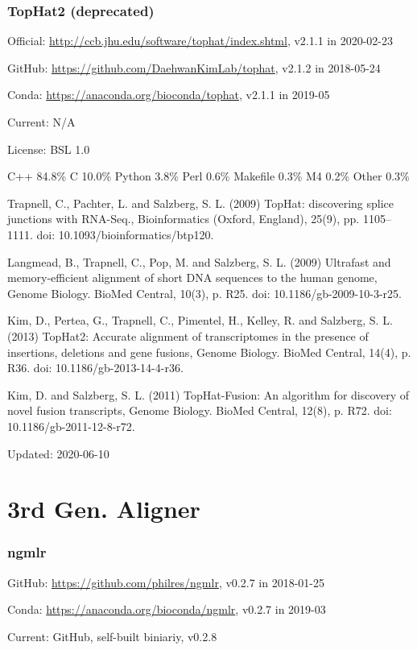 \documentclass[]{article}
\begin{document}
\section{TopHat2 (deprecated)}

Official: \url{http://ccb.jhu.edu/software/tophat/index.shtml}, v2.1.1 in 2020-02-23

GitHub: \url{https://github.com/DaehwanKimLab/tophat}, v2.1.2 in 2018-05-24

Conda: \url{https://anaconda.org/bioconda/tophat}, v2.1.1 in 2019-05

Current: N/A

License: BSL 1.0

C++ 84.8\% C 10.0\% Python 3.8\% Perl 0.6\% Makefile 0.3\% M4 0.2\% Other 0.3\%

Trapnell, C., Pachter, L. and Salzberg, S. L. (2009) TopHat: discovering splice junctions with RNA-Seq., Bioinformatics (Oxford, England), 25(9), pp. 1105–1111. doi: 10.1093/bioinformatics/btp120.

Langmead, B., Trapnell, C., Pop, M. and Salzberg, S. L. (2009) Ultrafast and memory-efficient alignment of short DNA sequences to the human genome, Genome Biology. BioMed Central, 10(3), p. R25. doi: 10.1186/gb-2009-10-3-r25.

Kim, D., Pertea, G., Trapnell, C., Pimentel, H., Kelley, R. and Salzberg, S. L. (2013) TopHat2: Accurate alignment of transcriptomes in the presence of insertions, deletions and gene fusions, Genome Biology. BioMed Central, 14(4), p. R36. doi: 10.1186/gb-2013-14-4-r36.

Kim, D. and Salzberg, S. L. (2011) TopHat-Fusion: An algorithm for discovery of novel fusion transcripts, Genome Biology. BioMed Central, 12(8), p. R72. doi: 10.1186/gb-2011-12-8-r72.

Updated: 2020-06-10

\part{3rd Gen. Aligner}

\section{ngmlr}

GitHub: \url{https://github.com/philres/ngmlr}, v0.2.7 in 2018-01-25

Conda: \url{https://anaconda.org/bioconda/ngmlr}, v0.2.7 in 2019-03

Current: GitHub, self-built biniariy, v0.2.8
\end{document}
